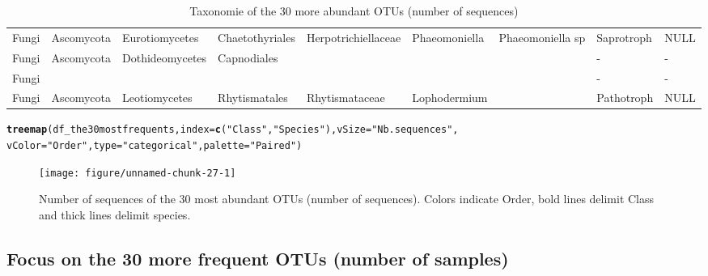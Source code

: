 \documentclass[12pt]{article}\usepackage[]{graphicx}\usepackage[]{color}
\makeatletter
\newcommand{\hlstr}[1]{\textcolor[rgb]{0.192,0.494,0.8}{#1}}%
\newcommand{\hlstd}[1]{\textcolor[rgb]{0.345,0.345,0.345}{#1}}%
\newcommand{\hlkwc}[1]{\textcolor[rgb]{0.333,0.667,0.333}{#1}}%
\newcommand{\hlkwd}[1]{\textcolor[rgb]{0.737,0.353,0.396}{\textbf{#1}}}%
\newenvironment{kframe}{%
 \def\at@end@of@kframe{}%
 \ifinner\ifhmode%
  \def\at@end@of@kframe{\end{minipage}}%
  \begin{minipage}{\columnwidth}%
 \fi\fi%
 \def\FrameCommand##1{\hskip\@totalleftmargin \hskip-\fboxsep
 \colorbox{shadecolor}{##1}\hskip-\fboxsep
     \hskip-\linewidth \hskip-\@totalleftmargin \hskip\columnwidth}%
 \MakeFramed {\advance\hsize-\width
   \@totalleftmargin\z@ \linewidth\hsize
   \@setminipage}}%
 {\par\unskip\endMakeFramed%
 \at@end@of@kframe}
\newenvironment{knitrout}{}{} %
\numberwithin{figure}{section}
\makeatother
\begin{document}
\begin{landscape}
\begin{table}[ht]
\begin{tabular}{lllllllll}
  Fungi & Ascomycota & Eurotiomycetes & Chaetothyriales & Herpotrichiellaceae & Phaeomoniella & Phaeomoniella sp & Saprotroph & NULL \\ 
  Fungi & Ascomycota & Dothideomycetes & Capnodiales &  &  &  & - & - \\ 
  Fungi &  &  &  &  &  &  & - & - \\ 
  Fungi & Ascomycota & Leotiomycetes & Rhytismatales & Rhytismataceae & Lophodermium &  & Pathotroph & NULL \\ 
   \hline
\end{tabular}
\endgroup
\caption{Taxonomie of the 30 more
             abundant OTUs (number of sequences)} 
\end{table}

\end{landscape}

\begin{knitrout}\small
{}\color{fgcolor}\begin{kframe}
\begin{alltt}
\hlkwd{treemap}\hlstd{(df_the30mostfrequents,} \hlkwc{index} \hlstd{=} \hlkwd{c}\hlstd{(}\hlstr{"Class"}\hlstd{,} \hlstr{"Species"}\hlstd{),} \hlkwc{vSize} \hlstd{=} \hlstr{"Nb.sequences"}\hlstd{,}
        \hlkwc{vColor} \hlstd{=} \hlstr{"Order"}\hlstd{,} \hlkwc{type} \hlstd{=} \hlstr{"categorical"}\hlstd{,} \hlkwc{palette} \hlstd{=} \hlstr{"Paired"}\hlstd{)}
\end{alltt}
\end{kframe}\begin{figure}

{\centering \texttt{[image: figure/unnamed-chunk-27-1]} 

}

\caption[Number of sequences of the 30 most abundant OTUs (number of sequences)]{Number of sequences of the 30 most abundant OTUs (number of sequences). Colors indicate Order, bold lines delimit Class and thick lines delimit species.}\label{fig:unnamed-chunk-27}
\end{figure}


\end{knitrout}

  \subsection{Focus on the 30 more frequent OTUs (number of samples)}
\end{document}
